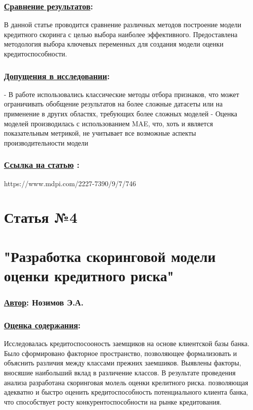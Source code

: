 \documentclass[a4paper,14pt]{article}
\begin{document}
\subsubsection*{\underline{Сравнение результатов}:}
В данной статье проводится сравнение различных методов построение модели кредитного скоринга с целью выбора наиболее эффективного. Предоставлена методология выбора ключевых переменных для создания модели оценки кредитоспособности. 
\subsubsection*{\underline{Допущения в исследовании}:}
- В работе использовались классические методы отбора признаков, что может ограничивать обобщение результатов на более сложные датасеты или на применение в других областях, требующих более сложных моделей \newline
- Оценка моделей производилась с использованием MAE, что, хоть и является показательным метрикой, не учитывает все возможные аспекты производительности модели
\subsubsection*{\underline{Ссылка на статью} :}
https://www.mdpi.com/2227-7390/9/7/746


\newpage

\section*{Статья №4}
\section*{"Разработка скоринговой модели оценки кредитного риска"}
\subsubsection*{\underline {Автор}: Нозимов Э.А.}
\subsubsection*{\underline{Оценка содержания}:}
Исследовалась кредитоспосооность заемщиков на основе клиентской базы банка. Было сформировано факторное пространство, позволяющее формализовать и объяснить различия между классами прежних заемшиков. Выявлены факторы, вносяшие наибольший вклад в различение классов. В результате проведения анализа разработана скоринговая молель оценки крелитного риска. позволяющая адекватно и быстро оценить кредитоспособность потенциального клиента банка, что способствует росту конкурентоспособности на рынке кредитования.
\end{document}
